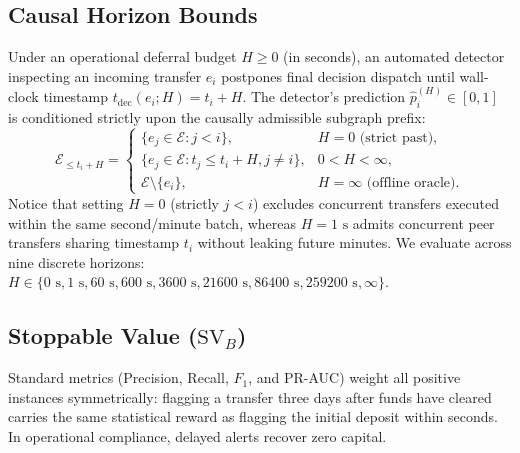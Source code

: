 \documentclass[sigconf,nonacm]{acmart}
\begin{document}
\subsection{Causal Horizon Bounds}
Under an operational deferral budget $H \ge 0$ (in seconds), an automated detector inspecting an incoming transfer $e_i$ postpones final decision dispatch until wall-clock timestamp $t_{\text{dec}}(e_i; H) = t_i + H$. The detector's prediction $\hat{p}_i^{(H)} \in [0, 1]$ is conditioned strictly upon the causally admissible subgraph prefix:
\begin{equation}
\label{eq:causal_prefix}
\mathcal{E}_{\le t_i + H} = \begin{cases}
  \{ e_j \in \mathcal{E} : j < i \}, & H = 0 \text{ (strict past)}, \\
  \{ e_j \in \mathcal{E} : t_j \le t_i + H, j \neq i \}, & 0 < H < \infty, \\
  \mathcal{E} \setminus \{e_i\}, & H = \infty \text{ (offline oracle)}.
\end{cases}
\end{equation}
Notice that setting $H = 0$ (strictly $j < i$) excludes concurrent transfers executed within the same second/minute batch, whereas $H = 1\text{ s}$ admits concurrent peer transfers sharing timestamp $t_i$ without leaking future minutes. We evaluate across nine discrete horizons: $H \in \{0\text{ s}, 1\text{ s}, 60\text{ s}, 600\text{ s}, 3600\text{ s}, 21600\text{ s}, 86400\text{ s}, 259200\text{ s}, \infty\}$.

\subsection{Stoppable Value ($\text{SV}_B$)}
Standard metrics (Precision, Recall, $F_1$, and PR-AUC) weight all positive instances symmetrically: flagging a transfer three days after funds have cleared carries the same statistical reward as flagging the initial deposit within seconds. In operational compliance, delayed alerts recover zero capital.
\end{document}
